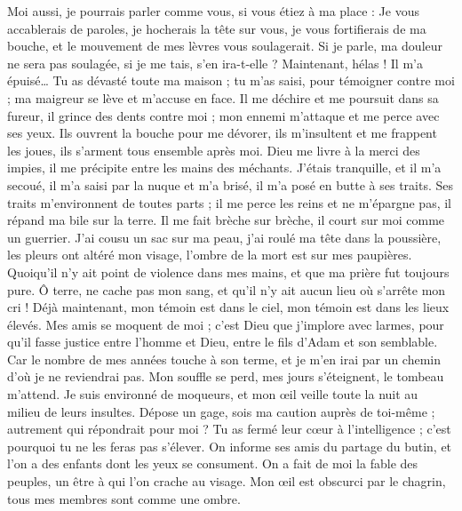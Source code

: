 \begin{multicols}{2}
Moi aussi, je pourrais parler comme vous, si vous étiez à ma place : Je vous accablerais de paroles, je hocherais la tête sur vous,
je vous fortifierais de ma bouche, et le mouvement de mes lèvres vous soulagerait.
Si je parle, ma douleur ne sera pas soulagée, si je me tais, s'en ira-t-elle ?
Maintenant, hélas ! Il m'a épuisé… Tu as dévasté toute ma maison ;
tu m'as saisi, pour témoigner contre moi ; ma maigreur se lève et m'accuse en face.
Il me déchire et me poursuit dans sa fureur, il grince des dents contre moi ; mon ennemi m'attaque et me perce avec ses yeux.
Ils ouvrent la bouche pour me dévorer, ils m'insultent et me frappent les joues, ils s'arment tous ensemble après moi.
Dieu me livre à la merci des impies, il me précipite entre les mains des méchants.
J'étais tranquille, et il m'a secoué, il m'a saisi par la nuque et m'a brisé, il m'a posé en butte à ses traits.
Ses traits m'environnent de toutes parts ; il me perce les reins et ne m'épargne pas, il répand ma bile sur la terre.
Il me fait brèche sur brèche, il court sur moi comme un guerrier.
J'ai cousu un sac sur ma peau, j'ai roulé ma tête dans la poussière,
les pleurs ont altéré mon visage, l'ombre de la mort est sur mes paupières.
Quoiqu'il n'y ait point de violence dans mes mains, et que ma prière fut toujours pure.
Ô terre, ne cache pas mon sang, et qu'il n'y ait aucun lieu où s'arrête mon cri !
Déjà maintenant, mon témoin est dans le ciel, mon témoin est dans les lieux élevés.
Mes amis se moquent de moi ; c'est Dieu que j'implore avec larmes,
pour qu'il fasse justice entre l'homme et Dieu, entre le fils d'Adam et son semblable.
Car le nombre de mes années touche à son terme, et je m'en irai par un chemin d'où je ne reviendrai pas.
\VerseOne{}Mon souffle se perd, mes jours s'éteignent, le tombeau m'attend.
Je suis environné de moqueurs, et mon œil veille toute la nuit au milieu de leurs insultes.
Dépose un gage, sois ma caution auprès de toi-même ; autrement qui répondrait pour moi ?
Tu as fermé leur cœur à l'intelligence ; c'est pourquoi tu ne les feras pas s'élever.
On informe ses amis du partage du butin, et l'on a des enfants dont les yeux se consument.
On a fait de moi la fable des peuples, un être à qui l'on crache au visage.
Mon œil est obscurci par le chagrin, tous mes membres sont comme une ombre.

\end{multicols}
